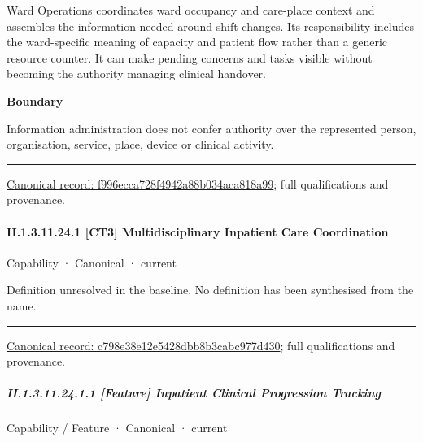 Ward Operations coordinates ward occupancy and care-place context and assembles the information needed around shift changes. Its responsibility includes the ward-specific meaning of capacity and patient flow rather than a generic resource counter. It can make pending concerns and tasks visible without becoming the authority managing clinical handover.



\textbf{Boundary}



Information administration does not confer authority over the represented person, organisation, service, place, device or clinical activity.



\medskip\hrule\medskip

{\footnotesize \href{../../../../continuum/strategy/capability/f996ecca728f4942a88b034aca818a99.md}{Canonical record: f996ecca728f4942a88b034aca818a99}; full qualifications and provenance.}\par
\paragraph*{II.1.3.11.24.1 [CT3] Multidisciplinary Inpatient Care Coordination}
\label{navigation:II.1.3.11.24.1}

\label{element:c798e38e12e5428dbb8b3cabc977d430}
{\small Capability · Canonical · current}\par

Definition unresolved in the baseline. No definition has been synthesised from the name.



\medskip\hrule\medskip

{\footnotesize \href{../../../../continuum/strategy/capability/c798e38e12e5428dbb8b3cabc977d430.md}{Canonical record: c798e38e12e5428dbb8b3cabc977d430}; full qualifications and provenance.}\par
\subparagraph*{II.1.3.11.24.1.1 [Feature] Inpatient Clinical Progression Tracking}
\label{navigation:II.1.3.11.24.1.1}

\label{element:863265027ecb432595b9c6d45adf1190}
{\small Capability / Feature · Canonical · current}\par

